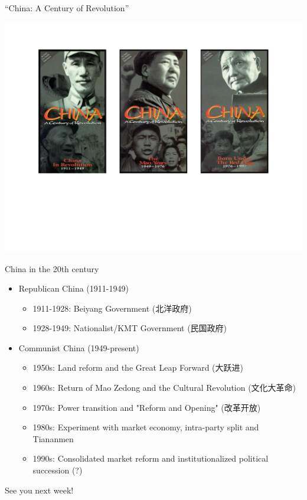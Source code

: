 \documentclass[
  10pt,
  ignorenonframetext,
]{beamer}
\begin{document}
\begin{frame}{``China: A Century of Revolution''}
\protect\hypertarget{china-a-century-of-revolution}{}
\begin{center}\includegraphics[width=0.95\linewidth]{Figs/docs} \end{center}
\end{frame}

\begin{frame}{China in the 20th century}
\protect\hypertarget{china-in-the-20th-century}{}
\begin{itemize}
  \item Republican China (1911-1949)
  \vspace{0.2cm}
  \begin{itemize}
    \item 1911-1928: Beiyang Government (北洋政府)
    \item 1928-1949: Nationalist/KMT Government (民国政府) 
  \end{itemize}
  \vspace{0.4cm}
  \item Communist China (1949-present)
  \vspace{0.2cm}
  \begin{itemize}
    \item 1950s: Land reform and the Great Leap Forward (大跃进)
    \item 1960s: Return of Mao Zedong and the Cultural Revolution (文化大革命)
    \item 1970s: Power transition and "Reform and Opening" (改革开放)
    \item 1980s: Experiment with market economy, intra-party split and Tiananmen
    \item 1990s: Consolidated market reform and institutionalized political succession (?)
  \end{itemize}
\end{itemize}
\end{frame}

\begin{frame}
\vspace{1cm}

See you next week!
\end{frame}
\end{document}

